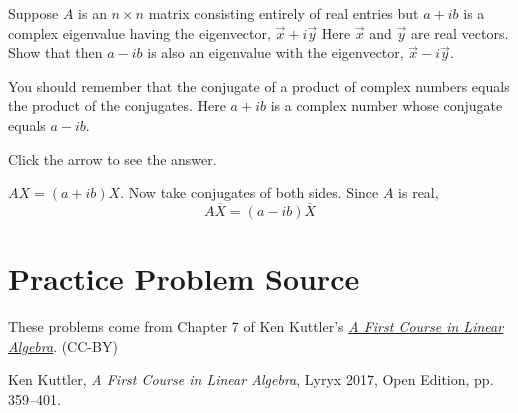 \documentclass{ximera}
\begin{document}
\begin{problem}\label{prb:8.32} Suppose $A$ is an $n\times n$ matrix consisting entirely of real
entries but $a+ib$ is a complex eigenvalue having the eigenvector, $\vec{x}+i\vec{y}$ Here $\vec{x}$ and $\vec{y}$ are real vectors. Show
that then $a-ib$ is also an eigenvalue with the eigenvector, $\vec{x}-i\vec{y}$.

\begin{hint}
You should remember that the conjugate of a
product of complex numbers equals the product of the conjugates. Here $a+ib$
is a complex number whose conjugate equals $a-ib.$


Click the arrow to see the answer.
\begin{expandable}
$AX=\left(
a+ib\right)X$. Now take conjugates of both sides. Since $A$ is
real,
\[
A\overline{X}=\left( a-ib\right) \overline{X}
\]
\end{expandable}
 
\end{hint}
\end{problem}


\section*{Practice Problem Source}
These problems come from Chapter 7 of Ken Kuttler's \href{https://open.umn.edu/opentextbooks/textbooks/a-first-course-in-linear-algebra-2017}{\it A First Course in Linear Algebra}. (CC-BY)

Ken Kuttler, {\it  A First Course in Linear Algebra}, Lyryx 2017, Open Edition, pp. 359--401. 
\end{document}
